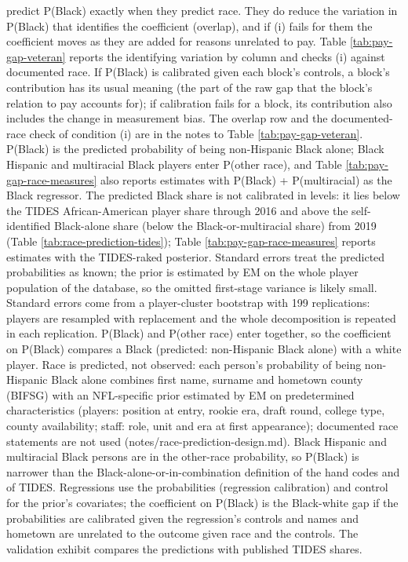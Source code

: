 {predict P(Black) exactly when they predict race. They do reduce the variation in P(Black) that identifies the coefficient (overlap), and if (i) fails for them the coefficient moves as they are added for reasons unrelated to pay. Table \ref{tab:pay-gap-veteran} reports the identifying variation by column and checks (i) against documented race. If P(Black) is calibrated given each block's controls, a block's contribution has its usual meaning (the part of the raw gap that the block's relation to pay accounts for); if calibration fails for a block, its contribution also includes the change in measurement bias. The overlap row and the documented-race check of condition (i) are in the notes to Table \ref{tab:pay-gap-veteran}. P(Black) is the predicted probability of being non-Hispanic Black alone; Black Hispanic and multiracial Black players enter P(other race), and Table \ref{tab:pay-gap-race-measures} also reports estimates with P(Black) + P(multiracial) as the Black regressor. The predicted Black share is not calibrated in levels: it lies below the TIDES African-American player share through 2016 and above the self-identified Black-alone share (below the Black-or-multiracial share) from 2019 (Table \ref{tab:race-prediction-tides}); Table \ref{tab:pay-gap-race-measures} reports estimates with the TIDES-raked posterior. Standard errors treat the predicted probabilities as known; the prior is estimated by EM on the whole player population of the database, so the omitted first-stage variance is likely small. Standard errors come from a player-cluster bootstrap with 199 replications: players are resampled with replacement and the whole decomposition is repeated in each replication. P(Black) and P(other race) enter together, so the coefficient on P(Black) compares a Black (predicted: non-Hispanic Black alone) with a white player. Race is predicted, not observed: each person's probability of being non-Hispanic Black alone combines first name, surname and hometown county (BIFSG) with an NFL-specific prior estimated by EM on predetermined characteristics (players: position at entry, rookie era, draft round, college type, county availability; staff: role, unit and era at first appearance); documented race statements are not used (notes/race-prediction-design.md). Black Hispanic and multiracial Black persons are in the other-race probability, so P(Black) is narrower than the Black-alone-or-in-combination definition of the hand codes and of TIDES. Regressions use the probabilities (regression calibration) and control for the prior's covariates; the coefficient on P(Black) is the Black-white gap if the probabilities are calibrated given the regression's controls and names and hometown are unrelated to the outcome given race and the controls. The validation exhibit compares the predictions with published TIDES shares.
\par}

